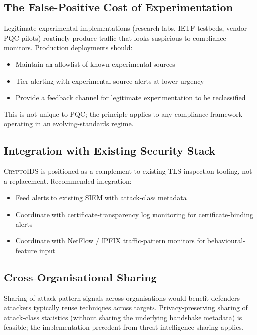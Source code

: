 \documentclass[sigconf,nonacm]{acmart}
\begin{document}
\subsection{The False-Positive Cost of Experimentation}

Legitimate experimental implementations (research labs, IETF
testbeds, vendor PQC pilots) routinely produce traffic that
looks suspicious to compliance monitors. Production deployments
should:

\begin{itemize}
  \item Maintain an allowlist of known experimental sources
  \item Tier alerting with experimental-source alerts at lower
        urgency
  \item Provide a feedback channel for legitimate experimentation
        to be reclassified
\end{itemize}

This is not unique to PQC; the principle applies to any
compliance framework operating in an evolving-standards regime.

\subsection{Integration with Existing Security Stack}

\textsc{CryptoIDS} is positioned as a complement to existing
TLS inspection tooling, not a replacement. Recommended
integration:

\begin{itemize}
  \item Feed alerts to existing SIEM with attack-class metadata
  \item Coordinate with certificate-transparency log monitoring
        for certificate-binding alerts
  \item Coordinate with NetFlow / IPFIX traffic-pattern monitors
        for behavioural-feature input
\end{itemize}

\subsection{Cross-Organisational Sharing}

Sharing of attack-pattern signals across organisations would
benefit defenders---attackers typically reuse techniques across
targets. Privacy-preserving sharing of attack-class statistics
(without sharing the underlying handshake metadata) is feasible;
the implementation precedent from threat-intelligence sharing
applies.
\end{document}
